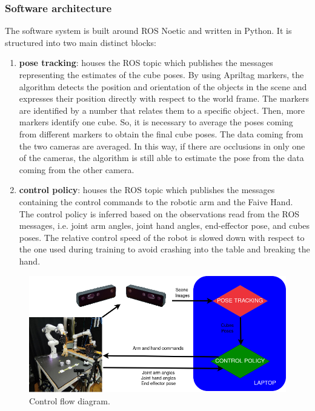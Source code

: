 \documentclass[a4paper]{article}
\begin{document}
\newpage

\subsubsection{Software architecture}
The software system is built around ROS Noetic and written in Python. It is structured into two main distinct blocks:

\begin{enumerate}
    \item \textbf{pose tracking}: houses the ROS topic which publishes the messages representing the estimates of the cube poses. By using Apriltag markers, the algorithm detects the position and orientation of the objects in the scene and expresses their position directly with respect to the world frame. The markers are identified by a number that relates them to a specific object. Then, more markers identify one cube. So, it is necessary to average the poses coming from different markers to obtain the final cube poses. The data coming from the two cameras are averaged. In this way, if there are occlusions in only one of the cameras, the algorithm is still able to estimate the pose from the data coming from the other camera.
    \item \textbf{control policy}: houses the ROS topic which publishes the messages containing the control commands to the robotic arm and the Faive Hand. The control policy is inferred based on the observations read from the ROS messages, i.e. joint arm angles, joint hand angles, end-effector pose, and cubes poses. The relative control speed of the robot is slowed down with respect to the one used during training to avoid crashing into the table and breaking the hand.
\end{enumerate}
\begin{figure}[!hb]
    \centering
    \includegraphics[scale=0.75]{images/control_structure_latex.png}
    \caption{Control flow diagram.}
\end{figure}
\end{document}
